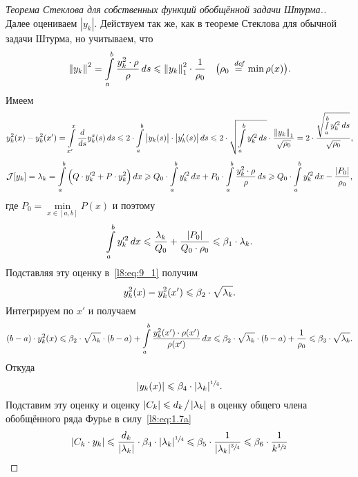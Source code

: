 \begin{proof}[Теорема Стеклова для собственных функций обобщённой задачи Штурма.]
	Далее оцениваем $|y_k|$. Действуем так же, как в теореме Стеклова для обычной задачи Штурма, но учитываем, что
	\begin{equation*}
		\hfill\norm{y_k}^2=\int\limits_a^b\frac{y_k^2\cdot\rho}{\rho}\,ds\leqslant\norm{y_k}^2_1\cdot\frac{1}{\rho_0}\quad\big(\rho_0\eqdef\min\rho(x)\big).\hfill
	\end{equation*}
	Имеем
	\begin{equation}
		\label{l8:eq:9_1}
		y^2_k(x)-y^2_k(x')=\int\limits_{x'}^{x}\frac{d}{ds}y_k^s(s)\,ds\leqslant2\cdot\int\limits_a^b\big|y_k(s)\big|\cdot\big|y'_k(s)\big|\,ds\leqslant2\cdot\sqrt{\int\limits_a^b y_k^{\prime2}\,ds}\cdot\frac{\left\|y_k\right\|_1}{\sqrt{\rho_0}}=2\cdot\frac{\sqrt{\smallint\limits_a^b y_k^{\prime2}\,ds}}{\sqrt{\rho_0}},
	\end{equation}
	\begin{equation*}
		\mathcal{J}[y_k]=\lambda_k=\int\limits_a^b\Big(Q\cdot y_k^{\prime2}+P\cdot y_k^2\Big)\,dx\geqslant Q_0\cdot\int\limits_a^b y_k^{\prime2}\,dx+P_0\cdot\int\limits_a^b\frac{y_k^2\cdot\rho}{\rho}\,ds\geqslant Q_0\cdot\int\limits_a^b y_k^{\prime2}\,dx-\frac{|P_0|}{\rho_0},
	\end{equation*}
	где $P_0=\min\limits_{x\in[a,b]}P(x)$ и поэтому 
	\begin{equation*}
		\hfill\int\limits_a^b y_k^{\prime2}\,dx\leqslant\frac{\lambda_k}{Q_0}+\frac{|P_0|}{Q_0\cdot\rho_0}\leqslant\beta_1\cdot\lambda_k.\hfill
	\end{equation*}
	Подставляя эту оценку в~\eqref{l8:eq:9_1} получим 
	\begin{equation*}
		\hfill y_k^2(x)-y_k^2(x')\leqslant\beta_2\cdot\sqrt{\lambda_k}.\hfill
	\end{equation*}
	Интегрируем по $x'$ и получаем 
	\begin{equation*}
		\hfill(b-a)\cdot y_k^2(x)\leqslant\beta_2\cdot\sqrt{\lambda_k}\cdot(b-a)+\int\limits_a^b\frac{y_k^2(x')\cdot\rho(x')}{\rho(x')}\,dx\leqslant\beta_2\cdot\sqrt{\lambda_k}\cdot(b-a)+\frac{1}{\rho_0}\leqslant\beta_3\cdot\sqrt{\lambda_k}.\hfill
	\end{equation*}
	Откуда
	\begin{equation*}
		\hfill|y_k(x)|\leqslant\beta_4\cdot|\lambda_k|^{\sfrac{1}{4}}.\hfill
	\end{equation*}
	Подставим эту оценку и оценку $|C_k|\leqslant d_k\!\bigm/\!|\lambda_k|$ в оценку общего члена обобщённого ряда Фурье в силу~\eqref{l8:eq:1.7a}
	\begin{equation*}
		\hfill|C_k\cdot y_k|\leqslant\frac{d_k}{|\lambda_k|}\cdot\beta_4\cdot|\lambda_k|^{\sfrac{1}{4}}\leqslant\beta_5\cdot\frac{1}{|\lambda_k|^{\sfrac{3}{4}}}\leqslant\beta_6\cdot\frac{1}{k^{\sfrac{3}{2}}}\hfill

\end{equation*}
\end{proof}
